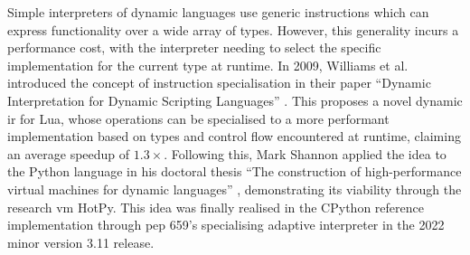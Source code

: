 Simple interpreters of dynamic languages use generic instructions which can express functionality over a wide array of types. However, this generality incurs a performance cost, with the interpreter needing to select the specific implementation for the current type at runtime.
In 2009, Williams et al. introduced the concept of instruction specialisation in their paper ``Dynamic Interpretation for Dynamic Scripting Languages'' \cite{williamsDynamicInterpretationDynamic2010}.
This proposes a novel dynamic \ac{ir} for Lua, whose operations can be specialised to a more performant implementation based on types and control flow encountered at runtime, claiming an average speedup of $1.3\times$.
Following this, Mark Shannon applied the idea to the Python language in his doctoral thesis ``The construction of high-performance virtual
machines for dynamic languages'' \cite{shannonConstructionHighperformanceVirtual2011}, demonstrating its viability through the research \ac{vm} HotPy.
This idea was finally realised in the CPython reference implementation through \ac{pep} 659's specialising adaptive interpreter in the 2022 minor version 3.11 release.

